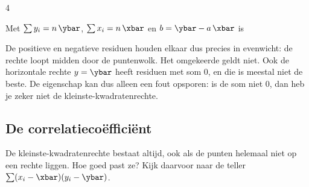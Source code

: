 \begin{alleenvoor}{4}
\begin{theorie}
\begin{bewijs}
Met $\sum y_i = n\,\ybar$, $\sum x_i = n\,\xbar$ en $b = \ybar - a\,\xbar$ is
\end{bewijs}
\end{theorie}

De positieve en negatieve residuen houden elkaar dus precies in evenwicht: de rechte loopt midden door de puntenwolk. Het omgekeerde geldt niet. Ook de horizontale rechte $y = \ybar$ heeft residuen met som $0$, en die is meestal niet de beste. De eigenschap kan dus alleen een fout opsporen: is de som niet $0$, dan heb je zeker niet de kleinste-kwadratenrechte.


\begin{oefeningen}
\end{oefeningen}

\subsection{De correlatiecoëfficiënt}

De kleinste-kwadratenrechte bestaat altijd, ook als de punten helemaal niet op een rechte liggen. Hoe goed past ze? Kijk daarvoor naar de teller $\sum (x_i - \xbar)(y_i - \ybar)$.


\end{alleenvoor}
